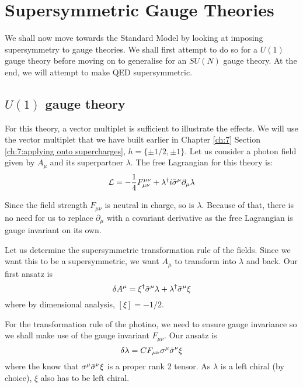 \chapter{Supersymmetric Gauge Theories}
\label{ch:10}
We shall now move towards the Standard Model by looking at imposing supersymmetry to gauge theories. We shall first attempt to do so for a $U(1)$ gauge theory before moving on to generalise for an $SU(N)$ gauge theory. At the end, we will attempt to make QED supersymmetric.

\section{$U(1)$ gauge theory}
\label{ch:10:u1 gauge theory} 
For this theory, a vector multiplet is sufficient to illustrate the effects. We will use the vector multiplet that we have built earlier in Chapter \ref{ch:7} Section \ref{ch:7:applying onto supercharges}, $h = \{\pm 1/2, \pm 1\}$. Let us consider a photon field given by $A_\mu$ and its superpartner $\lambda$. The free Lagrangian for this theory is:
\begin{equation}
    \mathcal{L} = - \frac{1}{4} F_{\mu \nu}^{\mu \nu} + \lambda^\dagger i\Bar{\sigma}^\mu \partial_\mu \lambda
    \label{eqn:10:u1 gauge theory:free lagrangian without auxiliary field}
\end{equation}

Since the field strength $F_{\mu \nu}$ is neutral in charge, so is $\lambda$. Because of that, there is no need for us to replace $\partial_\mu$ with a covariant derivative as the free Lagrangian is gauge invariant on its own.

Let us determine the supersymmetric transformation rule of the fields. Since we want this to be a supersymmetric, we want $A_\mu$ to transform into $\lambda$ and back. Our first ansatz is 
\begin{equation}
    \delta A^\mu = \xi^\dagger \Bar{\sigma}^\mu \lambda + \lambda^\dagger \Bar{\sigma}^\mu \xi
    \label{eqn:10:u1 gauge theory:photon field transformation rule ansatz}
\end{equation}
where by dimensional analysis, $[\xi] = -1/2$. 

For the transformation rule of the photino, we need to ensure gauge invariance so we shall make use of the gauge invariant $F_{\mu\nu}$. Our ansatz is
\begin{equation}
    \delta \lambda = C F_{\mu \nu} \sigma^\mu \Bar{\sigma}^\nu \xi
    \label{eqn:10:u1 gauge theory:photino transformation rule ansatz}
\end{equation}
where the know that $\sigma^\mu \Bar{\sigma}^\nu \xi$ is a proper rank 2 tensor. As $\lambda$ is a left chiral (by choice), $\xi$ also has to be left chiral.

